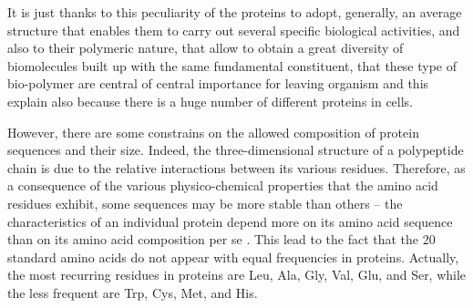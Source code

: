 It is just thanks to this peculiarity of the proteins to adopt, generally, an average structure that enables them to carry out several specific biological activities, and also to their polymeric nature, that allow to obtain a great diversity of biomolecules built up with the same fundamental constituent, that these type of bio-polymer are central of central importance for leaving organism and this explain also because there is a huge number of different proteins in cells.  

However, there are some constrains on the allowed composition of protein sequences and their size. 
Indeed, the three-dimensional structure of a polypeptide chain is due to the relative interactions between its various residues. Therefore, as a consequence of the various physico-chemical properties that the amino acid residues exhibit, some sequences may be more stable than others -- the characteristics of an individual protein depend more on its amino acid sequence than on its amino acid composition per se 
\cite{voet2016fundamentals}. 
This lead to the fact that the 20 standard amino acids do not appear with equal frequencies in proteins. Actually, the most recurring residues in proteins are Leu, Ala, Gly, Val, Glu, and Ser, while the less frequent are Trp, Cys, Met, and His. 

